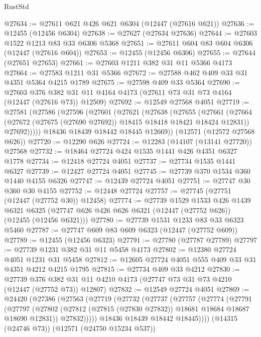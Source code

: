 \begin{lexlean}{RustStd}
\begin{coremodule}
@27634 := @27611 @621 @426 @621 @6304 (@12447 (@27616 @621))
@27636 := @12455 (@12456 @6304)
@27638 := @27627 (@27634 @27636)
@27644 := @27603 @1522 @1213 @83 @33 @6306 @5368
@27651 := @27611 @604 @83 @604 @6306 (@12447 (@27616 @604))
@27653 := @12455 (@12456 @6306)
@27655 := @27644 (@27651 @27653)
@27661 := @27603 @1211 @382 @31 @11 @5366 @4173
@27664 := @27583 @1211 @31 @5366
@27672 := @27588 @462 @409 @33 @31 @4351 @5364 @4215 @1789
@27675 := @27598 @409 @33 @5364
@27690 := @27603
    @376
    @382
    @31
    @11
    @4164
    @4173
    (@27611 @73 @31 @73 @4164 (@12447 (@27616 @73)) @12509)
@27692 := @12549 @27568 @4051
@27719 := @27581
    (@27586
      (@27596
        (@27601
          (@27621
            (@27638
              (@27655
                (@27661
                  (@27664 (@27672 (@27675 (@27690 @27692)) @18415 @18418 @18421 @18424 @12831))
                  @27692)))))
        @18436
        @18439
        @18442
        @18445
        @12669))
    (@12571 (@12572 @27568 @626))
@27720 := @12290 @626
@27724 := @12283 (@14107 (@13141 @27720)) @27568
@27732 := @18464 @27724 @424 @1535 @1441 @426 @4351 @6327 @1778
@27734 := @12418 @27724 @4051
@27737 := @27734 @1535 @1441 @6327
@27739 := @12427 @27724 @4051
@27745 := @27739 @370 @1534 @360 @1440 @4155 @6326
@27747 := @12439 @27724 @4051
@27751 := @27747 @30 @360 @30 @4155
@27752 := @12448 @27724
@27757 := @27745 (@27751 (@12447 (@27752 @30)) @12458)
@27774 := @27739
    @1529
    @1533
    @426
    @1439
    @6321
    @6325
    (@27747 @626 @426 @626 @6321 (@12447 (@27752 @626)) (@12455 (@12456 @6321)))
@27780 := @27739 @1531 @1233 @83 @33 @6323 @5460
@27787 := @27747 @609 @83 @609 @6323 (@12447 (@27752 @609))
@27789 := @12455 (@12456 @6323)
@27791 := @27780 (@27787 @27789)
@27797 := @27739 @1231 @382 @31 @11 @5458 @4173
@27802 := @12380 @27724 @4051 @1231 @31 @5458
@27812 := @12605 @27724 @4051 @555 @409 @33 @31 @4351 @4212 @4215 @1795
@27815 := @27734 @409 @33 @4212
@27830 := @27739
    @376
    @382
    @31
    @11
    @4210
    @4173
    (@27747 @73 @31 @73 @4210 (@12447 (@27752 @73)) @12807)
@27832 := @12549 @27724 @4051
@27869 := @24420
    (@27386
      (@27563
        (@27719
          (@27732
            (@27737
              (@27757
                (@27774
                  (@27791
                    (@27797
                      (@27802 (@27812 (@27815 (@27830 @27832)) @18681 @18684 @18687 @18690 @12831))
                      @27832)))))
            @18436
            @18439
            @18442
            @18445))))
    (@14315 (@24746 @73))
    (@12571 (@24750 @15234 @537))

\end{coremodule}
\end{lexlean}
